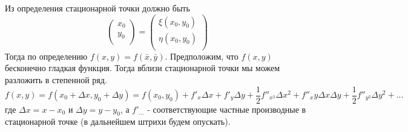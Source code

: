 \documentclass[a4paper]{article}
\begin{document}
Из определения стационарной точки должно быть
\begin{equation} \label{GrindEQ_b_kh_2} \left(
\begin{array}{c}
 x_0 \\
 y_0 \\
\end{array}
\right)=\left(
\begin{array}{c}
 \xi (x_0,y_0) \\
 \eta (x_0,y_0) \\
\end{array}
\right) \end{equation}
Тогда по определению $f(x,y)=f(\bar{x},\bar{y})$. Предположим, что $f(x,y)$ бесконечно гладкая функция. Тогда вблизи стационарной точки мы можем разложить в степенной ряд.
\begin{equation} \label{GrindEQ_b_kh_3} 
f(x,y)=f(x_0+\Delta x,y_0+\Delta y)=f(x_0,y_0)+f'_x\Delta x+f'_y\Delta y+ \dfrac{1}{2}f''_{x^2}\Delta x^2+f''_xy\Delta x\Delta y+\dfrac{1}{2}f''_{y^2}\Delta y^2+...
\end{equation}
где $\Delta x=x-x_0$ и $\Delta y=y-y_0$, а $f'_{...}$ - соответствующие частные производные в стационарной точке (в дальнейшем штрихи будем опускать). 
\end{document}
